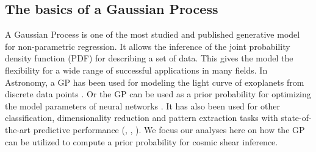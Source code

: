 \subsection{The basics of a Gaussian Process}
A Gaussian Process is one of the most studied and published 
generative model for non-parametric regression. 
It allows the inference of the joint probability density 
function (PDF) for describing a set of data. 
This gives the model the flexibility for a wide range
of successful applications in many fields. 
In Astronomy, a GP has been used for modeling 
the light curve of exoplanets from discrete data points \citep{Ambikasaran2014a}.
Or the GP can be used as a prior probability for optimizing the model parameters of
neural networks \citep{Snoek2012}. 
It has also been used for other classification, dimensionality reduction 
and pattern extraction tasks
with state-of-the-art predictive performance 
(\citealt{Wilson2013}, \citealt{Duvenaud2013}, \citealt{Rasmussen2006}).
We focus our analyses here on how the GP can be utilized to compute a prior
probability for cosmic shear inference.
 
